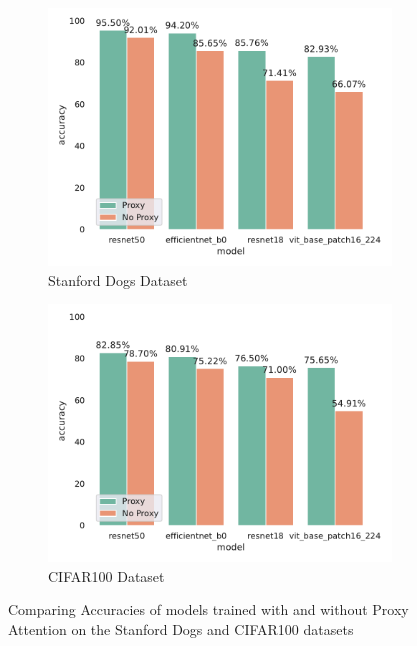 \documentclass[a4paper,11pt,openright]{book}
\begin{document}
\begin{figure}[!htb]
    \begin{subfigure}[h]{.5\textwidth}
        \includegraphics[width=\linewidth, right]{results/dogs_results.pdf}
        \caption{Stanford Dogs Dataset}
    \end{subfigure}
    \begin{subfigure}[h]{.5\textwidth}
        \includegraphics[width=\linewidth, left]{results/cifar100_results.pdf}
        \caption{CIFAR100 Dataset}
    \end{subfigure}
    \caption{Comparing Accuracies of models trained with and without Proxy Attention on the Stanford Dogs and CIFAR100 datasets}
    \label{fig:dogs_cifar100_results}
\end{figure}
\end{document}
